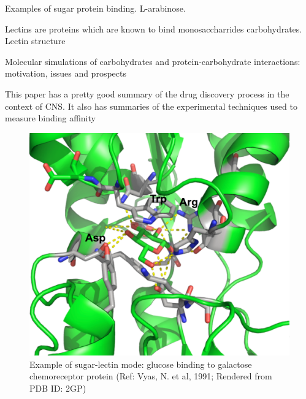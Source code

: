 Examples of sugar protein binding.  L-arabinose. %

Lectins are proteins which are known to bind monosaccharrides carbohydrates. Lectin structure\cite{Rini:1995p2497}

Molecular simulations of carbohydrates and protein-carbohydrate interactions: motivation, issues and prospects\cite{Fadda:2010p5889}

This paper has a pretty good summary of the drug discovery process in the context of CNS. It also has summaries of the experimental techniques used to measure binding affinity\cite{Hubbard:2011fs}

\begin{figure}
  \centering
  \includegraphics[width=6in]{figures/introduction/sugar_protein_binding.pdf}
  \caption[Sugar protein example]{Example of sugar-lectin mode: glucose binding to galactose chemoreceptor protein (Ref: Vyas, N. et al, 1991; Rendered from PDB ID: 2GP)}
  \label{fig:sugar_protein}
\end{figure}



